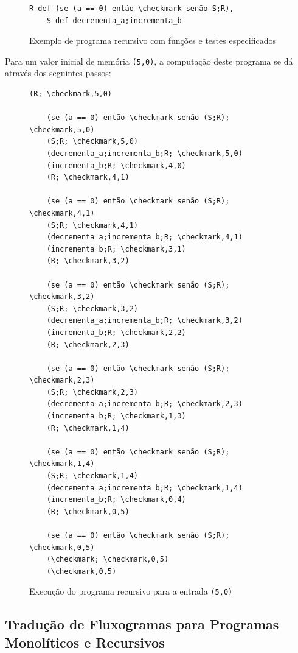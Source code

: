 \documentclass[12pt,fleqn]{article}
\begin{document}
\begin{figure}[H]
\begin{Verbatim}[commandchars=\\\{\},codes={\catcode`\$=3\catcode`\^=7}]
    R def (se (a == 0) então \checkmark senão S;R),
    S def decrementa_a;incrementa_b
\end{Verbatim}
\caption{Exemplo de programa recursivo com funções e testes especificados}
\end{figure}

\noindent
Para um valor inicial de memória \verb|(5,0)|, a computação deste programa se
dá através dos seguintes passos:

\begin{figure}[H]
\begin{Verbatim}[commandchars=\\\{\},codes={\catcode`\$=3\catcode`\^=7}]
    (R; \checkmark,5,0)

    (se (a == 0) então \checkmark senão (S;R); \checkmark,5,0)
    (S;R; \checkmark,5,0)
    (decrementa_a;incrementa_b;R; \checkmark,5,0)
    (incrementa_b;R; \checkmark,4,0)
    (R; \checkmark,4,1)

    (se (a == 0) então \checkmark senão (S;R); \checkmark,4,1)
    (S;R; \checkmark,4,1)
    (decrementa_a;incrementa_b;R; \checkmark,4,1)
    (incrementa_b;R; \checkmark,3,1)
    (R; \checkmark,3,2)

    (se (a == 0) então \checkmark senão (S;R); \checkmark,3,2)
    (S;R; \checkmark,3,2)
    (decrementa_a;incrementa_b;R; \checkmark,3,2)
    (incrementa_b;R; \checkmark,2,2)
    (R; \checkmark,2,3)

    (se (a == 0) então \checkmark senão (S;R); \checkmark,2,3)
    (S;R; \checkmark,2,3)
    (decrementa_a;incrementa_b;R; \checkmark,2,3)
    (incrementa_b;R; \checkmark,1,3)
    (R; \checkmark,1,4)

    (se (a == 0) então \checkmark senão (S;R); \checkmark,1,4)
    (S;R; \checkmark,1,4)
    (decrementa_a;incrementa_b;R; \checkmark,1,4)
    (incrementa_b;R; \checkmark,0,4)
    (R; \checkmark,0,5)

    (se (a == 0) então \checkmark senão (S;R); \checkmark,0,5)
    (\checkmark; \checkmark,0,5)
    (\checkmark,0,5)
\end{Verbatim}
\caption{Execução do programa recursivo para a entrada \texttt{(5,0)}}
\end{figure}

\newpage
\subsection{Tradução de Fluxogramas para Programas Monolíticos e Recursivos}
\end{document}
